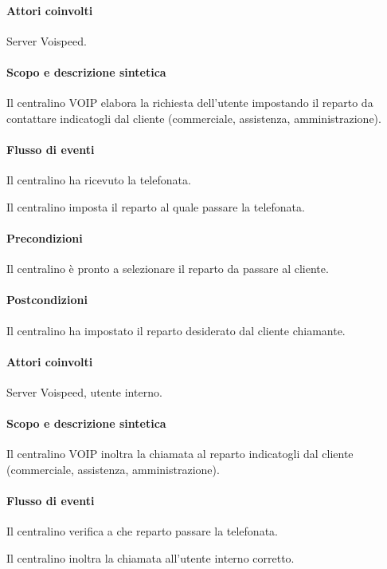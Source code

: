 \paragraph{Attori coinvolti} Server Voispeed.
\paragraph{Scopo e descrizione sintetica}
Il centralino VOIP elabora la richiesta dell'utente impostando il reparto da contattare indicatogli dal cliente (commerciale, assistenza, amministrazione).
\paragraph{Flusso di eventi}
\begin{elenconumerato}[\textbf{}]{\subsubsecindent}
\item Il centralino ha ricevuto la telefonata.
\item Il centralino imposta il reparto al quale passare la telefonata.
\end{elenconumerato}
\paragraph{Precondizioni} Il centralino \` e pronto a selezionare il reparto da passare al cliente.
\paragraph{Postcondizioni} Il centralino ha impostato il reparto desiderato dal cliente chiamante.

\paragraph{Attori coinvolti} Server Voispeed, utente interno.
\paragraph{Scopo e descrizione sintetica}
Il centralino VOIP  inoltra la chiamata al reparto indicatogli dal cliente (commerciale, assistenza, amministrazione).
\paragraph{Flusso di eventi}
\begin{elenconumerato}[\textbf{}]{\subsubsecindent}
\item Il centralino verifica a che reparto passare la telefonata.
\item Il centralino inoltra la chiamata all'utente interno corretto.
\end{elenconumerato}
